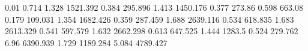 0.01       0.714      %
1.328      1521.392   %
0.384      295.896    %
1.413      1450.176   %
0.377      273.86     %
0.598      663.08     %
0.179      109.031    %
1.354      1682.426   %
0.359      287.459    %
1.688      2639.116   %
0.534      618.835    %
1.683      2613.329   %
0.541      597.579    %
1.632      2662.298   %
0.613      647.525    %
1.444      1283.5     %
0.524      279.762    %
6.96       6390.939   %
1.729      1189.284   %
5.084      4789.427   %
